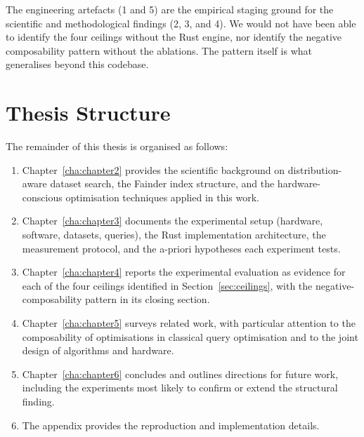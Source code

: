 The engineering artefacts (1 and 5) are the empirical staging ground for the scientific and methodological findings (2, 3, and 4). We would not have been able to identify the four ceilings without the Rust engine, nor identify the negative composability pattern without the ablations. The pattern itself is what generalises beyond this codebase.

\section{Thesis Structure}

The remainder of this thesis is organised as follows:
\begin{enumerate}
    \item Chapter~\ref{cha:chapter2} provides the scientific background on distribution-aware dataset search, the Fainder index structure, and the hardware-conscious optimisation techniques applied in this work.
    \item Chapter~\ref{cha:chapter3} documents the experimental setup (hardware, software, datasets, queries), the Rust implementation architecture, the measurement protocol, and the a-priori hypotheses each experiment tests.
    \item Chapter~\ref{cha:chapter4} reports the experimental evaluation as evidence for each of the four ceilings identified in Section~\ref{sec:ceilings}, with the negative-composability pattern in its closing section.
    \item Chapter~\ref{cha:chapter5} surveys related work, with particular attention to the composability of optimisations in classical query optimisation and to the joint design of algorithms and hardware.
    \item Chapter~\ref{cha:chapter6} concludes and outlines directions for future work, including the experiments most likely to confirm or extend the structural finding.
    \item The appendix provides the reproduction and implementation details.
\end{enumerate}


